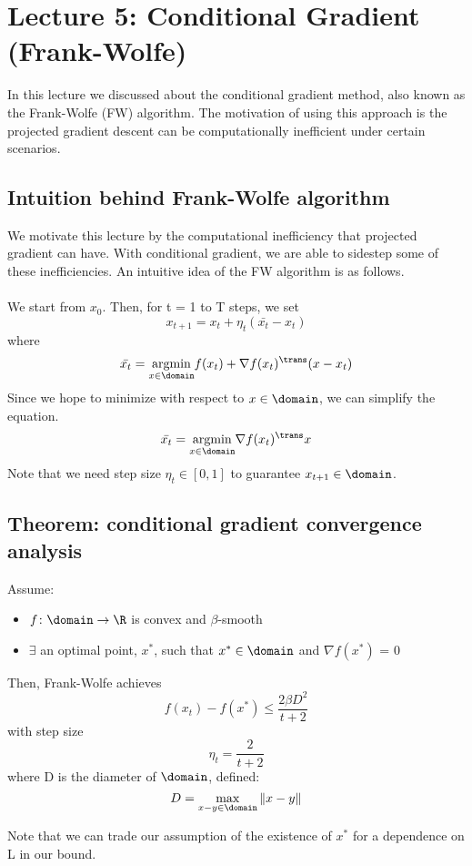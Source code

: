 \section{Lecture 5: Conditional Gradient (Frank-Wolfe)}
In this lecture we discussed about the conditional gradient method, also known as the Frank-Wolfe (FW) algorithm. The motivation of using this approach is the projected gradient descent can be computationally inefficient under certain scenarios.

\subsection{Intuition behind Frank-Wolfe algorithm}
We motivate this lecture by the computational inefficiency that projected gradient can have. With conditional gradient, we are able to sidestep some of these inefficiencies. An intuitive idea of the FW algorithm is as follows. \\
\\We start from $x_0$. Then, for t = 1 to T steps, we set
$$ x_{t+1} = x_t + \eta_t(\bar{x_t}-x_t) $$
where
$$ \bar{x_t} = \underset{x \in \domain}{\operatorname{argmin}} f(x_t) + \nabla f(x_t) ^\trans (x-x_t)$$
Since we hope to minimize with respect to $x \in \domain$, we can simplify the equation.
$$ \bar{x_t} = \underset{x \in \domain}{\operatorname{argmin}} \nabla f(x_t) ^\trans x $$
Note that we need step size $\eta_t \in [0,1]$ to guarantee $x_{t+1} \in \domain$.

\subsection{Theorem: conditional gradient convergence analysis}
\begin{theorem}
Assume:
\begin{itemize}
\item $f\colon\domain\to\R$ is convex and $\beta$-smooth
\item $\exists$ an optimal point, $x^*$, such that $x^* \in\domain$ and $\nabla f(x^*)$ = 0
\end{itemize}
Then, Frank-Wolfe achieves
$$ f(x_t) - f(x^*) \leq \frac{2\beta D^2}{t+2}$$
with step size 
$$\eta_t = \frac{2}{t+2}$$
where D is the diameter of $\domain$, defined:
$$ D = \max_{x-y \in \domain} \| x-y \|$$
\end{theorem}
Note that we can trade our assumption of the existence of $x^*$ for a dependence on L in our bound.

